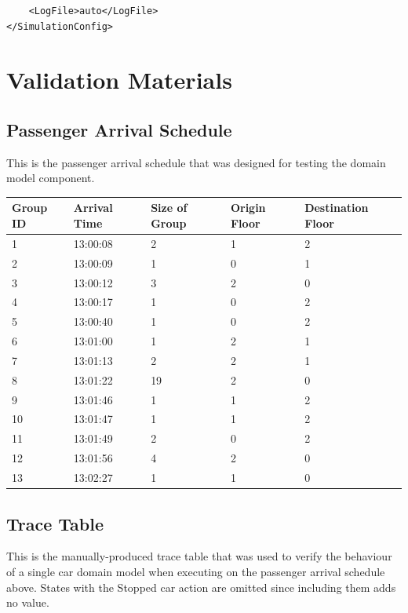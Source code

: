 \documentclass{UoYCSproject}
\begin{document}
\begin{appendices}
\begin{lstlisting}
	<LogFile>auto</LogFile>
</SimulationConfig>
\end{lstlisting}

\section{Validation Materials}

\subsection{Passenger Arrival Schedule}

This is the passenger arrival schedule that was designed for testing the domain model component.

\begin{tabular}{l | l | l | l | l}
	Group ID & Arrival Time & Size of Group & Origin Floor & Destination Floor \\
	\hline
	1 & 13:00:08 & 2 & 1 & 2 \\
	2 & 13:00:09 & 1 & 0 & 1 \\
	3 & 13:00:12 & 3 & 2 & 0 \\
	4 & 13:00:17 & 1 & 0 & 2 \\
	5 & 13:00:40 & 1 & 0 & 2 \\
	6 & 13:01:00 & 1 & 2 & 1 \\
	7 & 13:01:13 & 2 & 2 & 1 \\
	8 & 13:01:22 & 19 & 2 & 0 \\
	9 & 13:01:46 & 1 & 1 & 2 \\
	10 & 13:01:47 & 1 & 1 & 2 \\
	11 & 13:01:49 & 2 & 0 & 2 \\
	12 & 13:01:56 & 4 & 2 & 0 \\
	13 & 13:02:27 & 1 & 1 & 0 \\	
\end{tabular}

\subsection{Trace Table}

This is the manually-produced trace table that was used to verify the behaviour of a single car domain model when executing on the passenger arrival schedule above.  States with the Stopped car action are omitted since including them adds no value.


\end{appendices}
\end{document}
